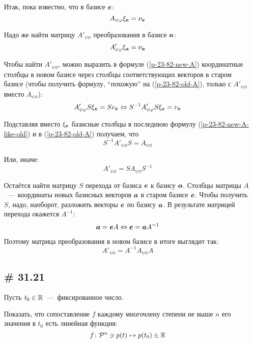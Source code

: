\documentclass[a4paper,12pt]{article}
\begin{document}
\begin{solution}
    Итак, пока известно, что в базисе $\boldsymbol e$:
    \begin{equation*}\label{p-23-82-old-A}
      A_{\psi \varphi} \xi_{\boldsymbol e} = \nu_{\boldsymbol e}
    \end{equation*}
    
    Надо же найти матрицу $A'_{\psi\phi}$ преобразования в базисе $\boldsymbol a$:
    \begin{equation*}\label{p-23-82-new-A}
      A'_{\psi\varphi} \xi_{\boldsymbol a} = \nu_{\boldsymbol a}
    \end{equation*}
    
    Чтобы найти $A'_{\psi\phi}$, можно выразить в формуле (\ref{p-23-82-new-A}) координатные столбцы в новом базисе через столбцы соответствующих векторов в старом базисе (чтобы получить формулу, ``похожую'' на (\ref{p-23-82-old-A}), только с $A'_{\psi\phi}$ вместо $A_{\psi\phi}$):
    \begin{equation*}\label{p-23-82-new-A-like-old}
      A'_{\psi\varphi} S \xi_{\boldsymbol e} = S \nu_{\boldsymbol e}
      \Leftrightarrow S^{-1} A'_{\psi\varphi} S \xi_{\boldsymbol e} = \nu_{\boldsymbol e}
    \end{equation*}
    
    Подставляя вместо $\xi_{\boldsymbol e}$ базисные столбцы в последнюю формулу (\ref{p-23-82-new-A-like-old}) и в (\ref{p-23-82-old-A}) получаем, что
    \[
      S^{-1} A'_{\psi\phi} S = A_{\psi\phi}
    \]
    
    Или, иначе:
    \[
      A'_{\psi\phi} = S A_{\psi\phi} S^{-1}
    \]
    
    Остаётся найти матрицу $S$ перехода от базиса $\boldsymbol e$ к базису $\boldsymbol a$.
    Столбцы матрицы $A$~---~координаты новых базисных векторов $\boldsymbol a$ в старом базисе $\boldsymbol e$.
    Чтобы получить $S$, надо, наоборот, разложить векторы $\boldsymbol e$ по базису $\boldsymbol a$.
    В результате матрицей перехода окажется $A^{-1}$:
    \[
      \boldsymbol a = \boldsymbol e A \Leftrightarrow \boldsymbol e = \boldsymbol a A^{-1}
    \]
    
    Поэтому матрица преобразования в новом базисе в итоге выглядит так:
    \[
      A'_{\psi\phi} = A^{-1} A_{\psi\phi} A
    \]
  \end{solution}
  
  
  \subsection{\# 31.21}
  Пусть $t_0 \in \operatorname{\mathbb R}$~---~фиксированное число.
  
  Показать, что сопоставление $f$ каждому многочлену степени не выше $n$ его значения в $t_0$ есть линейная функция:
  \[
    f\colon \mathcal P^n \ni p(t) \mapsto p(t_0) \in \operatorname{\mathbb R}
  \]
  
\end{document}

